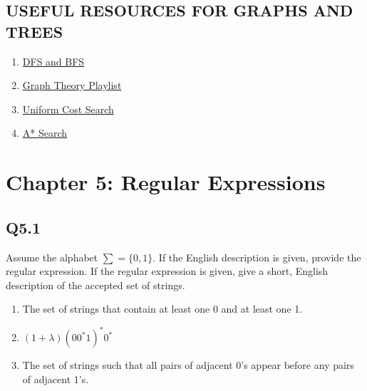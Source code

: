 \documentclass{article}
\begin{document}
\subsection*{USEFUL RESOURCES FOR GRAPHS AND TREES}
\begin{enumerate}
    \item \href{https://www.youtube.com/watch?v=zaBhtODEL0w}{DFS and BFS}
    \item \href{https://www.youtube.com/watch?v=DgXR2OWQnLc&list=PLDV1Zeh2NRsDGO4--qE8yH72HFL1Km93P}{Graph Theory Playlist}
    \item \href{https://www.youtube.com/watch?v=dRMvK76xQJI}{Uniform Cost Search}
    \item \href{https://www.youtube.com/watch?v=6TsL96NAZCo}{A* Search}
\end{enumerate}
\newpage
\section*{Chapter 5: Regular Expressions}
\subsection*{Q5.1}
Assume the alphabet $\sum=\{0,1\}$. If the English description is given, provide the regular expression. If the regular expression is given, give a short, English description of the accepted set of strings.
\begin{enumerate}[label=\alph*.]
    \item The set of strings that contain at least one 0 and at least one 1.
    \item $(1+\lambda)(00^*1)^*0^*$
    \item The set of strings such that all pairs of adjacent 0's appear before any pairs of adjacent 1's.
\end{enumerate}
\newpage
\end{document}
